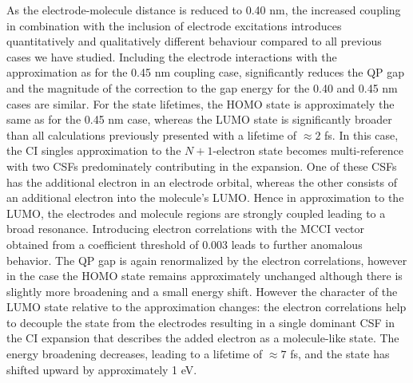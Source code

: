 As the electrode-molecule distance is reduced to 0.40 nm, the increased
coupling in combination with the inclusion of electrode excitations
introduces quantitatively and qualitatively different behaviour compared
to all previous cases we have studied. Including the electrode interactions
with the \dscf approximation as for the 0.45 nm coupling case,
significantly reduces the QP gap and the magnitude of the correction to
the gap energy for the 0.40 and 0.45 nm cases are similar. For the state
lifetimes, the HOMO state is approximately the same as for the 0.45 nm
case, whereas the LUMO state is significantly broader than all calculations
previously presented with a lifetime of $\approx 2$ fs. In this case,
the CI singles approximation to the $N+1$-electron state becomes
multi-reference with two CSFs predominately contributing in the expansion.
One of these CSFs has the additional electron in an electrode orbital,
whereas the other consists of an additional electron into the molecule's
LUMO. Hence in \dscf approximation to the LUMO, the electrodes and
molecule regions are strongly coupled leading to a broad resonance.
Introducing electron correlations with the MCCI vector obtained from a
coefficient threshold of 0.003 leads to further anomalous behavior. The
QP gap is again renormalized by the electron correlations, however in the
case the HOMO state remains approximately unchanged although there is
slightly more broadening and a small energy shift. However the character
of the LUMO state relative to the \dscf approximation changes: the
electron correlations help to decouple the state from the electrodes
resulting in a single dominant CSF in the CI expansion that describes the
added electron as a molecule-like state. The energy broadening decreases,
leading to a lifetime of $\approx 7$ fs, and the state has shifted upward
by approximately 1 eV.
 
